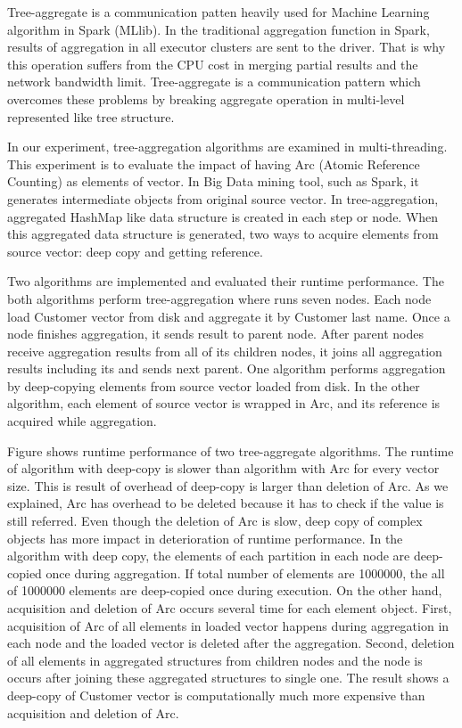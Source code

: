 Tree-aggregate is a communication patten heavily used for Machine Learning algorithm in Spark (MLlib). 
In the traditional aggregation function in Spark, results of aggregation in all executor clusters are sent to the driver. 
That is why this operation suffers from the CPU cost in merging partial results and the network bandwidth limit.
Tree-aggregate is a communication pattern which overcomes these problems by breaking aggregate operation in multi-level represented like tree structure.

In our experiment, tree-aggregation algorithms are examined in multi-threading. This experiment is to evaluate the impact of having Arc (Atomic Reference Counting) as elements of vector. 
In Big Data mining tool, such as Spark, it generates intermediate objects from original source vector. In tree-aggregation, aggregated HashMap like data structure is created in each step or node. 
When this aggregated data structure is generated, two ways to acquire elements from source vector: deep copy and getting reference. 

Two algorithms are implemented and evaluated their runtime performance. The both algorithms perform tree-aggregation where runs seven nodes. 
Each node load Customer vector from disk and aggregate it by Customer last name. Once a node finishes aggregation, it sends result to parent node. 
After parent nodes receive aggregation results from all of its children nodes, it joins all aggregation results including its and sends next parent. 
One algorithm performs aggregation by deep-copying elements from source vector loaded from disk. In the other algorithm, each element of source vector 
is wrapped in Arc, and its reference is acquired while aggregation. 

Figure shows runtime performance of two tree-aggregate algorithms. The runtime of algorithm with deep-copy is slower than algorithm with Arc for every vector size. 
This is result of overhead of deep-copy is larger than deletion of Arc. As we explained, Arc has overhead to be deleted because it has to check if the value is still referred. 
Even though the deletion of Arc is slow, deep copy of complex objects has more impact in deterioration of runtime performance. 
In the algorithm with deep copy, the elements of each partition in each node are deep-copied once during aggregation. 
If total number of elements are 1000000, the all of 1000000 elements are deep-copied once during execution. On the other hand, acquisition and deletion of Arc occurs several time for each element object.
First, acquisition of Arc of all elements in loaded vector happens during aggregation in each node and the loaded vector is deleted after the aggregation. 
Second, deletion of all elements in aggregated structures from children nodes and the node is occurs after joining these aggregated structures to single one. 
The result shows a deep-copy of Customer vector is computationally much more expensive than acquisition and deletion of Arc. 

